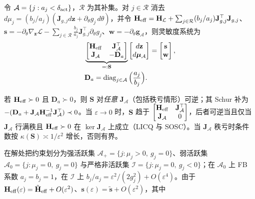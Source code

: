 令 $\mathcal A=\{j:a_j<\delta_{\rm act}\}$，$\mathcal R$ 为其补集。对 $j\in\mathcal R$ 消去 $d\mu_j=(b_j/a_j)(\mathbf J_{g,j}d\mathbf z+\partial_\theta g_j\,d\theta)$，并令 $\mathbf H_{\rm eff}=\mathbf H_{\mathcal L}+\sum_{j\in\mathcal R}(b_j/a_j)\mathbf J_{g,j}^\top\mathbf J_{g,j}$、
$\mathbf s=-\partial_\theta\nabla_{\mathbf z}\mathcal L-\sum_{j\in\mathcal R}\frac{b_j}{a_j}\mathbf J_{g,j}^\top\partial_\theta g_j$、$\mathbf w=-\partial_\theta\mathbf g_{\mathcal A}$，则灵敏度系统为
\begin{equation}
\begin{aligned}
&\underbrace{\begin{bmatrix}\mathbf H_{\rm eff}&\mathbf J_{\mathcal A}^\top\\ \mathbf J_{\mathcal A}&-\mathbf D_a\end{bmatrix}}_{=:\mathbf S}
\begin{bmatrix}d\mathbf z\\ d\boldsymbol\mu_{\mathcal A}\end{bmatrix}
=\begin{bmatrix}\mathbf s\\ \mathbf w\end{bmatrix},\\
&\mathbf D_a=\operatorname{diag}_{j\in\mathcal A}\Big(\frac{a_j}{b_j}\Big).
\end{aligned}
\label{eq:saddle}
\end{equation}
\begin{theorem}[秩亏下的可逆性]\label{thm:fb}
若 $\mathbf H_{\rm eff}\succ0$ 且 $\mathbf D_a\succ0$，则 $\mathbf S$ 对\emph{任意} $\mathbf J_{\mathcal A}$（包括秩亏情形）可逆；其 Schur 补为 $-(\mathbf D_a+\mathbf J_{\mathcal A}\mathbf H_{\rm eff}^{-1}\mathbf J_{\mathcal A}^\top)\prec0$。当 $\varepsilon\to0$ 时，$\mathbf S$ 趋于 $\begin{bmatrix}\mathbf H_{\rm eff}&\mathbf J_{\mathcal A}^\top\\ \mathbf J_{\mathcal A}&0\end{bmatrix}$，后者可逆当且仅当 $\mathbf J_{\mathcal A}$ 行满秩且 $\mathbf H_{\rm eff}\succ0$ 在 $\ker\mathbf J_{\mathcal A}$ 上成立（LICQ 与 SOSC）。当 $\mathbf J_{\mathcal A}$ 秩亏时条件数按 $\kappa(\mathbf S)\asymp1/\varepsilon^2$ 增长，否则有界。
\end{theorem}
在解处把约束划分为强活跃集 $\mathcal A_+=\{j:\mu_j>0,\ g_j=0\}$、弱活跃集 $\mathcal A_0=\{j:\mu_j=0,\ g_j=0\}$ 与严格非活跃集 $\mathcal I=\{j:\mu_j=0,\ g_j<0\}$；在 $\mathcal A_0$ 上 FB 系数 $a_j=b_j=1$，在 $\mathcal I$ 上 $b_j/a_j=\varepsilon^2/(2g_j^2)+O(\varepsilon^4)$。由于 $\mathbf H_{\rm eff}(\varepsilon)=\tilde{\mathbf H}_{\rm eff}+O(\varepsilon^2)$、$\mathbf s(\varepsilon)=\tilde{\mathbf s}+O(\varepsilon^2)$，其中
